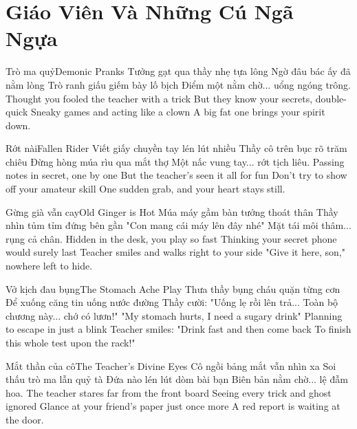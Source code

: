 \chapter{Giáo Viên Và Những Cú Ngã Ngựa}

\begin{tutuyetbox}{Trò ma quỷ}{Demonic Pranks}
Tưởng gạt qua thầy nhẹ tựa lông
Ngờ đâu bác ấy đã nằm lòng
Trò ranh giấu giếm bày lố bịch
Điểm một nằm chờ... uổng ngóng trông.
\tcblower
Thought you fooled the teacher with a trick 
But they know your secrets, double-quick 
Sneaky games and acting like a clown 
A big fat one brings your spirit down.
\end{tutuyetbox}

\begin{tutuyetbox}{Rớt nài}{Fallen Rider}
Viết giấy chuyền tay lén lút nhiều
Thầy cô trên bục rõ trăm chiêu
Đừng hòng múa rìu qua mắt thợ
Một nấc vung tay... rớt tịch liêu.
\tcblower
Passing notes in secret, one by one 
But the teacher's seen it all for fun 
Don't try to show off your amateur skill 
One sudden grab, and your heart stays still.
\end{tutuyetbox}

\begin{tutuyetbox}{Gừng già vẫn cay}{Old Ginger is Hot}
Múa máy gầm bàn tưởng thoát thân
Thầy nhìn tủm tỉm đứng bên gần
"Con mang cái máy lên đây nhé"
Mặt tái môi thâm... rụng cả chân.
\tcblower
Hidden in the desk, you play so fast
Thinking your secret phone would surely last
Teacher smiles and walks right to your side
"Give it here, son," nowhere left to hide.
\end{tutuyetbox}

\begin{tutuyetbox}{Vở kịch đau bụng}{The Stomach Ache Play}
Thưa thầy bụng cháu quặn từng cơn
Để xuống căng tin uống nước đường
Thầy cười: "Uống lẹ rồi lên trả...
Toàn bộ chương này... chớ có lươn!"
\tcblower
"My stomach hurts, I need a sugary drink"
Planning to escape in just a blink
Teacher smiles: "Drink fast and then come back
To finish this whole test upon the rack!"
\end{tutuyetbox}

\begin{tutuyetbox}{Mắt thần của cô}{The Teacher's Divine Eyes}
Cô ngồi bảng mắt vẫn nhìn xa
Soi thấu trò ma lẫn quỷ tà
Đứa nào lén lút dòm bài bạn
Biên bản nằm chờ... lệ đẫm hoa.
\tcblower
The teacher stares far from the front board
Seeing every trick and ghost ignored
Glance at your friend's paper just once more
A red report is waiting at the door.
\end{tutuyetbox}

